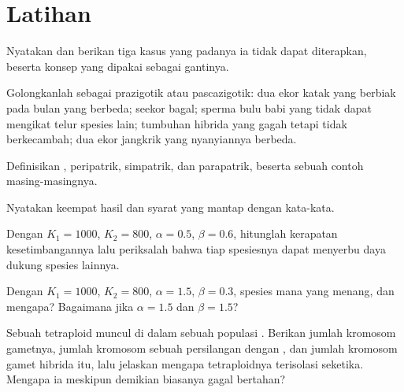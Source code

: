\section{Latihan}

\begin{exercise}[$\star$]\label{exo:b2:speciation:1}
Nyatakan  dan berikan tiga kasus yang padanya ia
tidak dapat diterapkan, beserta konsep yang dipakai sebagai gantinya.
\end{exercise}

\begin{exercise}[$\star$]\label{exo:b2:speciation:2}
Golongkanlah sebagai prazigotik atau pascazigotik: dua ekor katak yang
berbiak pada bulan yang berbeda; seekor bagal; sperma bulu babi yang
tidak dapat mengikat telur spesies lain; tumbuhan hibrida yang gagah
tetapi  tidak berkecambah; dua ekor jangkrik yang nyanyiannya
berbeda.
\end{exercise}

\begin{exercise}[$\star$]\label{exo:b2:speciation:3}
Definisikan , peripatrik, simpatrik, dan parapatrik,
beserta sebuah contoh masing-masingnya.
\end{exercise}

\begin{exercise}[$\star$]\label{exo:b2:speciation:4}
Nyatakan keempat hasil  dan syarat  yang mantap dengan kata-kata.
\end{exercise}

\begin{exercise}[$\star\star$]\label{exo:b2:speciation:5}
Dengan $K_1 = 1000$, $K_2 = 800$, $\alpha = 0.5$, $\beta = 0.6$,
hitunglah kerapatan kesetimbangannya lalu periksalah bahwa tiap
spesiesnya dapat menyerbu daya dukung spesies lainnya.
\end{exercise}

\begin{exercise}[$\star\star$]\label{exo:b2:speciation:6}
Dengan $K_1 = 1000$, $K_2 = 800$, $\alpha = 1.5$, $\beta = 0.3$,
spesies mana yang menang, dan mengapa? Bagaimana jika $\alpha = 1.5$ dan $\beta = 1.5$?
\end{exercise}

\begin{exercise}[$\star\star$]\label{exo:b2:speciation:7}
Sebuah tetraploid muncul di dalam sebuah populasi . Berikan
jumlah kromosom gametnya, jumlah kromosom sebuah persilangan dengan
, dan jumlah kromosom gamet hibrida itu, lalu jelaskan
mengapa tetraploidnya terisolasi seketika. Mengapa ia meskipun demikian
biasanya gagal bertahan?
\end{exercise}

